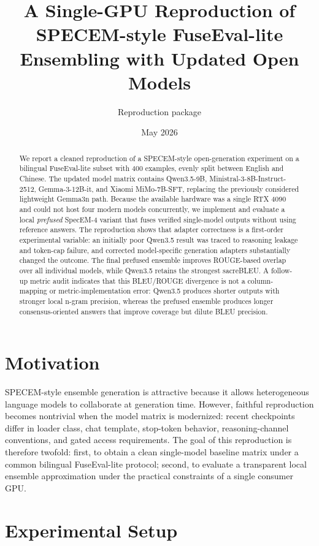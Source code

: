 \documentclass[11pt]{article}
\title{A Single-GPU Reproduction of SPECEM-style FuseEval-lite Ensembling with Updated Open Models}
\author{Reproduction package}
\date{May 2026}
\begin{document}
\maketitle

\begin{abstract}
We report a cleaned reproduction of a SPECEM-style open-generation experiment on a bilingual FuseEval-lite subset with 400 examples, evenly split between English and Chinese. The updated model matrix contains Qwen3.5-9B, Ministral-3-8B-Instruct-2512, Gemma-3-12B-it, and Xiaomi MiMo-7B-SFT, replacing the previously considered lightweight Gemma3n path. Because the available hardware was a single RTX 4090 and could not host four modern models concurrently, we implement and evaluate a local \emph{prefused} SpecEM-4 variant that fuses verified single-model outputs without using reference answers. The reproduction shows that adapter correctness is a first-order experimental variable: an initially poor Qwen3.5 result was traced to reasoning leakage and token-cap failure, and corrected model-specific generation adapters substantially changed the outcome. The final prefused ensemble improves ROUGE-based overlap over all individual models, while Qwen3.5 retains the strongest sacreBLEU. A follow-up metric audit indicates that this BLEU/ROUGE divergence is not a column-mapping or metric-implementation error: Qwen3.5 produces shorter outputs with stronger local n-gram precision, whereas the prefused ensemble produces longer consensus-oriented answers that improve coverage but dilute BLEU precision.
\end{abstract}

\section{Motivation}
SPECEM-style ensemble generation is attractive because it allows heterogeneous language models to collaborate at generation time. However, faithful reproduction becomes nontrivial when the model matrix is modernized: recent checkpoints differ in loader class, chat template, stop-token behavior, reasoning-channel conventions, and gated access requirements. The goal of this reproduction is therefore twofold: first, to obtain a clean single-model baseline matrix under a common bilingual FuseEval-lite protocol; second, to evaluate a transparent local ensemble approximation under the practical constraints of a single consumer GPU.

\section{Experimental Setup}
\end{document}
